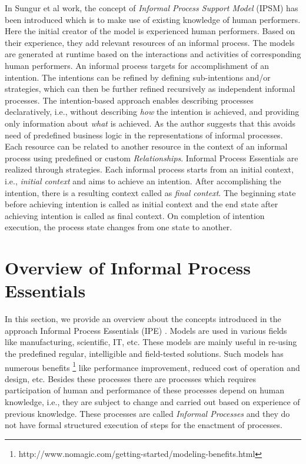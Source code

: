 In Sungur et al \cite{Sungur2014a} work, the concept of \textit{Informal Process Support Model} (IPSM) has been introduced which is to make use of existing knowledge of human performers. Here the initial creator of the model is experienced human performers. Based on their experience, they add relevant  resources of an informal process. The models are generated at runtime based on the interactions and activities of corresponding human performers. An informal process targets for accomplishment of an intention. The intentions can be refined by defining sub-intentions and/or strategies, which can then be further refined recursively as independent informal processes. The intention-based approach enables describing processes declaratively, i.e., without describing \textit{how} the intention is achieved, and providing only information about \textit{what} is achieved. As the author \cite{Sungur2014a} suggests that this avoids need of predefined business logic in the representations of informal processes. Each resource can be related to another resource in the context of an informal process using predefined or custom \textit{Relationships}. Informal Process Essentials are realized through strategies. Each informal process starts from an initial context, i.e., \textit{initial context} and aims to achieve an intention. After accomplishing the intention, there is a resulting context called as \textit{final context}. The beginning state before achieving intention is called as initial context and the end state after achieving intention is called as final context. On completion of intention execution, the process state changes from one state to another.

\section{Overview of Informal Process Essentials}
\label{sec:basicconcepts}
In this section, we provide an overview about the concepts introduced in the approach Informal Process Essentials (IPE) \cite{Sungur2014a}. Models are used in various fields like manufacturing, scientific, IT, etc. These models are mainly useful in re-using the predefined regular, intelligible and field-tested solutions. Such models has numerous benefits \footnote{http://www.nomagic.com/getting-started/modeling-benefits.html} like performance improvement, reduced cost of operation and design, etc. Besides these processes there are processes which requires participation of human and performance of these  processes depend on human knowledge, i.e., they are subject to change and carried out based on experience of previous knowledge. These processes are called \textit{Informal Processes} and they do not have formal structured execution of steps for the enactment of processes. 

